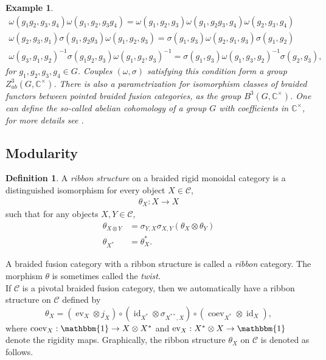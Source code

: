 \documentclass[a4paper, 10pt]{book}
\newtheorem{Expl}[theorem]{Example}
\theoremstyle{definition}
\newtheorem{Def}[theorem]{Definition}
\numberwithin{equation}{chapter}
\newcommand\inv{^{-1}}
\newcommand\id{\operatorname{id}}
\newcommand\kk{\mathbb C}
\newcommand\C{\mathcal C}
\newcommand\ev{\operatorname{ev}}
\newcommand\coev{\operatorname{coev}}
\begin{document}
\begin{Expl}
\begin{align*}
 	\omega(g_1g_2, g_3, g_4) \omega(g_1, g_2, g_3g_4) = \omega(g_1, g_2, g_3) \omega(g_1, g_2g_3, g_4) \omega(g_2, g_3, g_4)\\
 	\omega (g_2, g_3, g_1) \sigma(g_1, g_2g_3) \omega(g_1, g_2, g_3) = \sigma(g_1, g_3) \omega(g_2, g_1, g_3) \sigma(g_1, g_2)\\
 	\omega(g_3, g_1, g_2)\inv \sigma(g_1g_2, g_3) \omega(g_1, g_2, g_3) \inv = \sigma(g_1, g_3) \omega(g_1, g_3, g_2)\inv \sigma(g_2, g_3),
 \end{align*}for $g_1, g_2, g_3, g_4 \in G$. Couples $(\omega, \sigma)$ satisfying this condition form a group $Z_{ab}^3(G, \kk^\times)$. There is also a parametrization for isomorphism classes of braided functors between pointed braided fusion categories, as the group $B^3(G, \kk^\times)$. One can define the so-called \textit{abelian cohomology} of a group $G$ with coefficients in $\kk^\times$, for more details see \cite[Section 8.4]{EGNO}.
 \fi
\end{Expl}
\subsection{Modularity}
\begin{Def}\rm\label{twistdef}
 A \textit{ribbon structure} on a braided rigid monoidal category is a distinguished isomorphism for every object $X\in \C$,
\begin{align}
\theta_X: X \rightarrow X\nonumber
\end{align}
 such that for any objects $X,Y \in \C$, \begin{align}
\theta_{X\otimes Y} &= \sigma_{Y,X}\sigma_{X,Y}(\theta_X\otimes \theta_Y)\label{twist}\\
\theta_{X^*}&=\theta_X^*. \label{twistdual}
\end{align}
 \end{Def}
 A braided fusion category with a ribbon structure is called a \textit{ribbon} category.  The morphism $\theta$ is sometimes called the \textit{twist}. \\If $\C$ is a pivotal braided fusion category, then we automatically have a ribbon structure on $\C$ defined by \begin{equation}
 	 \theta_X = (\ev_X \otimes j_X)\circ(\id_{X^*} \otimes \sigma_{X^{**}, X})\circ(\coev_{X^*} \otimes \id_X),\label{thetax} 
 \end{equation}
 where $\coev_X:\mathbbm{1}\rightarrow X\otimes X^*$ and $\ev_X:X^*\otimes X\rightarrow \mathbbm{1}$ denote the rigidity maps. Graphically, the ribbon structure $\theta_X$ on $\C$ is denoted as follows.
\end{document}
